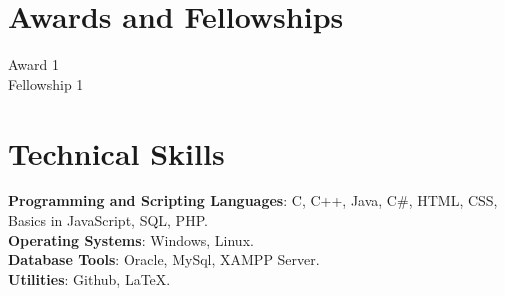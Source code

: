 \documentclass[margin,line]{res}
\begin{document}
\begin{resume}
\section{\sc Awards and Fellowships}
Award 1\\
Fellowship 1\\
\fi

\iffalse
\section{\sc Personal Achievements}
---------------------\\
---------------------
\fi
\section{\sc Technical Skills}
{\bf Programming and Scripting Languages}:  C, C++, Java, C\#, HTML, CSS, Basics in JavaScript, SQL, PHP.\\
{\bf Operating Systems}: Windows, Linux.\\
\iffalse
{\bf Tools}: Intel VTunes, GDB, Valgrind, Latex, Subversion, Crystal Reports, Informatica, Business Objects, IBM WebSphere Studio, MicroStrategy, Rational Rose Suite, Macromedia Dreamweaver, Adobe Photoshop \\
\fi
{\bf Database Tools}: Oracle, MySql, XAMPP Server.\\ 
{\bf Utilities}: Github, LaTeX. 
\vspace{0.3cm}

\iffalse

\end{resume}
\end{document}
